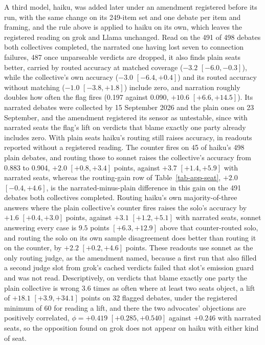 A third model, haiku, was added later under an amendment registered
before its run, with the same change on its 249-item set and
one debate per item and framing, and the rule above is applied to haiku on
its own, which leaves the registered reading on grok and Llama unchanged.
Read on the 491 of 498 debates both collectives completed, the narrated one
having lost seven to connection failures, 487 once
unparseable verdicts are dropped, it also finds plain seats better, carried
by routed accuracy at matched coverage ($-3.2$ $[-6.0, -0.3]$), while the
collective's own accuracy ($-3.0$ $[-6.4, +0.4]$) and its routed accuracy
without matching ($-1.0$ $[-3.8, +1.8]$) include zero, and narration
roughly doubles how often the flag fires (0.197 against 0.090, $+10.6$
$[+6.6, +14.5]$).
Its narrated debates were collected by 15 September 2026 and the plain ones
on 23 September, and the amendment registered its sensor as untestable, since
with narrated seats the flag's lift on verdicts that blame exactly one party
already includes zero.
With plain seats haiku's routing still raises accuracy, in readouts reported
without a registered reading. The counter fires on 45 of haiku's 498 plain
debates, and routing those to sonnet raises the collective's accuracy from
0.883 to 0.904, $+2.0$ $[+0.8, +3.4]$ points, against $+3.7$
$[+1.4, +5.9]$ with narrated seats, whereas the routing-gain row of
Table~\ref{tab-app-seat}, $+2.0$ $[-0.4, +4.6]$, is the narrated-minus-plain
difference in this gain on the 491 debates both collectives completed.
Routing haiku's own majority-of-three answers where the plain collective's
counter fires raises the solo's accuracy by $+1.6$ $[+0.4, +3.0]$ points,
against $+3.1$ $[+1.2, +5.1]$ with narrated seats, sonnet answering every
case is $9.5$ points $[+6.3, +12.9]$ above that counter-routed solo, and
routing the solo on its own sample disagreement does better than routing it
on the counter, by $+2.2$ $[+0.2, +4.6]$ points.
These readouts use sonnet as the only routing judge, as the amendment named,
because a first run that also filled a second judge slot from grok's cached
verdicts failed that slot's emission guard and was not read.
Descriptively, on verdicts that blame exactly one party the plain collective
is wrong 3.6 times as often where at least two seats object, a lift of
$+18.1$ $[+3.9, +34.1]$ points on 32 flagged debates, under the registered
minimum of 60 for reading a lift, and there the two advocates' objections
are positively correlated, $\phi = +0.419$ $[+0.285, +0.540]$ against
$+0.246$ with narrated seats, so the opposition found on grok does not
appear on haiku with either kind of seat.

